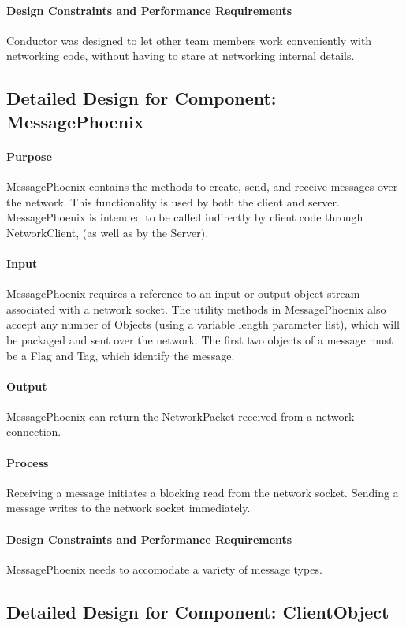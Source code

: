 \documentclass[12pt,a4paper]{article}
\begin{document}
\paragraph{Design Constraints and Performance Requirements} Conductor was designed to let other team members work conveniently with networking code, without having to stare at networking internal details.


\subsection{Detailed Design for Component: MessagePhoenix}
\paragraph{Purpose} MessagePhoenix contains the methods to create, send, and receive messages over the network. This functionality is used by both the client and server. MessagePhoenix is intended to be called indirectly by client code through NetworkClient, (as well as by the Server).
\paragraph{Input} MessagePhoenix requires a reference to an input or output object stream associated with a network socket. The utility methods in MessagePhoenix also accept any number of Objects (using a variable length parameter list), which will be packaged and sent over the network. The first two objects of a message must be a Flag and Tag, which identify the message. 
\paragraph{Output} MessagePhoenix can return the NetworkPacket received from a network connection. 
\paragraph{Process} Receiving a message initiates a blocking read from the network socket. Sending a message writes to the network socket immediately. 
\paragraph{Design Constraints and Performance Requirements} MessagePhoenix needs to accomodate a variety of message types. 

\subsection{Detailed Design for Component: ClientObject }
\end{document}
